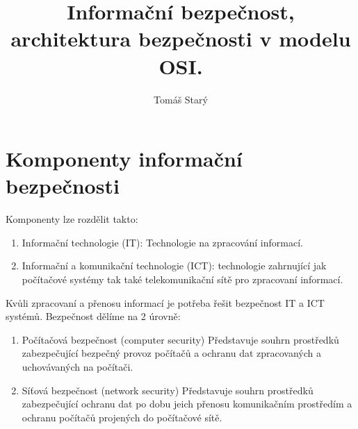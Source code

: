 \documentclass{szzclass}
\title{Informační bezpečnost, architektura bezpečnosti v modelu OSI.}
\author{Tomáš Starý}
\begin{document}
\section{Komponenty informační bezpečnosti}

Komponenty lze rozdělit takto:
\begin{enumerate}
    \item Informační technologie (IT): Technologie na zpracování informací.
    \item Informační a komunikační technologie (ICT): technologie zahrnující jak počítačové systémy
    tak také telekomunikační sítě pro zpracovaní informací.
\end{enumerate}

Kvůli zpracovaní a přenosu informací je potřeba řešit bezpečnost IT a ICT systémů. Bezpečnost dělíme na 2 úrovně:
\begin{enumerate}
    \item Počítačová bezpečnost (computer security)
          Představuje souhrn prostředků zabezpečující bezpečný provoz počítačů a ochranu dat
          zpracovaných a uchovávaných na počítači.
    \item Síťová bezpečnost (network security)
          Představuje souhrn prostředků zabezpečující ochranu dat po dobu jeich přenosu komunikačním
          prostředím a ochranu počítačů projených do počítačové sítě.
\end{enumerate}
\end{document}
